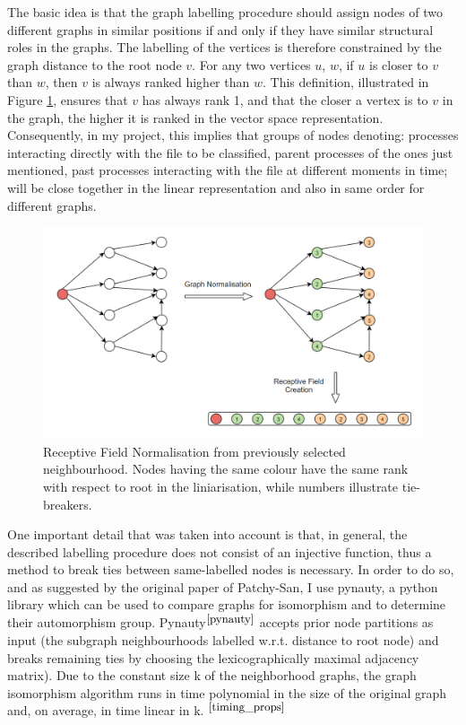 The basic idea is that the graph labelling procedure should assign nodes of two different graphs in similar positions if and only if they have similar structural roles in the graphs. The labelling of the vertices is therefore constrained by the graph distance to the root node $v$. For any two vertices $u$, $w$, if $u$ is closer to $v$ than $w$, then $v$ is
always ranked higher than $w$. This definition, illustrated in Figure \ref{normalisation}, ensures that $v$ has always rank 1, and that the closer a vertex is to $v$ in the graph, the higher it is ranked in the vector space representation. Consequently, in my project, this implies that groups of nodes denoting: processes interacting directly with the file to be classified, parent processes of the ones just mentioned, past processes interacting with the file at different moments in time; will be close together in the linear representation and also in same order for different graphs.\\

\begin{figure}[H]
  \centering
  \includegraphics[scale=0.45]{Images/normalisation.png}
  \caption{Receptive Field Normalisation from previously selected neighbourhood. Nodes having the same colour have the same rank with respect to root in the liniarisation, while numbers illustrate tie-breakers.}
  \label{normalisation}
\end{figure}

One important detail that was taken into account is that, in general, the described labelling procedure does not consist of an injective function, thus a method to break ties between same-labelled nodes is necessary. In order to do so, and as suggested by the original paper of Patchy-San, I use pynauty, a python library which can be used to compare graphs for isomorphism and to determine their automorphism group. Pynauty$^{\small \cite{pynauty}}$ accepts prior node partitions as input (the subgraph neighbourhoods labelled w.r.t. distance to root node) and breaks remaining ties by choosing the lexicographically maximal adjacency matrix). Due to the constant size k of the neighborhood graphs, the graph isomorphism algorithm runs in time polynomial in the size of the original graph and, on average, in time linear in k. $^{\small \cite{timing_props}}$ \\ 


